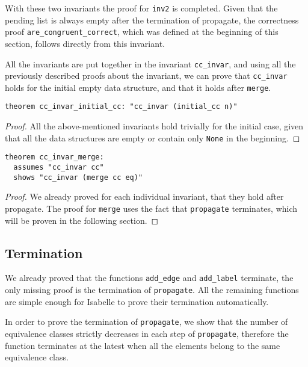 With these two invariants the proof for \lstinline{inv2} is completed. Given that the pending list is always empty after the termination of propagate, the correctness proof \lstinline{are_congruent_correct}, which was defined at the beginning of this section, follows directly from this invariant.

All the invariants are put together in the invariant \lstinline{cc_invar}, and using all the previously described proofs about the invariant, we can prove that \lstinline{cc_invar} holds for the initial empty data structure, and that it holds after \lstinline{merge}.

\begin{lstlisting}
theorem cc_invar_initial_cc: "cc_invar (initial_cc n)"
\end{lstlisting}

\begin{proof}
All the above-mentioned invariants hold trivially for the initial case, given that all the data structures are empty or contain only \lstinline{None} in the beginning.
\end{proof}

\begin{lstlisting}
theorem cc_invar_merge:
  assumes "cc_invar cc"
  shows "cc_invar (merge cc eq)"
\end{lstlisting}

\begin{proof}
We already proved for each individual invariant, that they hold after propagate.
The proof for \lstinline|merge| uses the fact that \lstinline{propagate} terminates, which will be proven in the following section.
\end{proof}

\subsection{Termination}\label{section:termination-propagate}

We already proved that the functions \lstinline|add_edge| and \lstinline|add_label| terminate, the only missing proof is the termination of \lstinline|propagate|. All the remaining functions are simple enough for Isabelle to prove their termination automatically.

In order to prove the termination of \lstinline{propagate}, we show that the number of equivalence classes strictly decreases in each step of \lstinline{propagate}, therefore the function terminates at the latest when all the elements belong to the same equivalence class.

